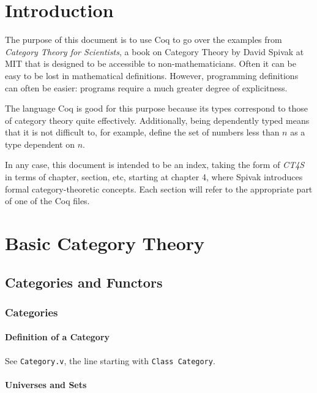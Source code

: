 \documentclass[12pt,twocolumn,oneside]{book}
\begin{document}
\setcounter{secnumdepth}{5}

\newcommand{\see}[2]{
        See \texttt{#1}, the line starting with \texttt{#2}.
    }
\newcommand{\reference}[4]{
        #1{#2} \see{#3}{#4}
    }

\chapter*{Introduction}

The purpose of this document is to use Coq to go over the examples from
\emph{Category Theory for Scientists}, a book on Category Theory by David
Spivak at MIT that is designed to be accessible to non-mathematicians. Often it
can be easy to be lost in mathematical definitions. However, programming definitions
can often be easier: programs require a much greater degree of explicitness.

The language Coq is good for this purpose because its types correspond to those
of category theory quite effectively. Additionally, being dependently typed means
that it is not difficult to, for example, define the set of numbers less than $n$
as a type dependent on $n$.

In any case, this document is intended to be an index, taking the form of \emph{CT4S}
in terms of chapter, section, etc, starting at chapter 4, where Spivak introduces
formal category-theoretic concepts. Each section will refer to the appropriate
part of one of the Coq files.

\setcounter{chapter}{3}
\chapter{Basic Category Theory}


\section{Categories and Functors}

\subsection{Categories}

\reference{\subsubsection}{Definition of a Category}{Category.v}{Class Category}

\subsubsection{Universes and Sets}
\end{document}

